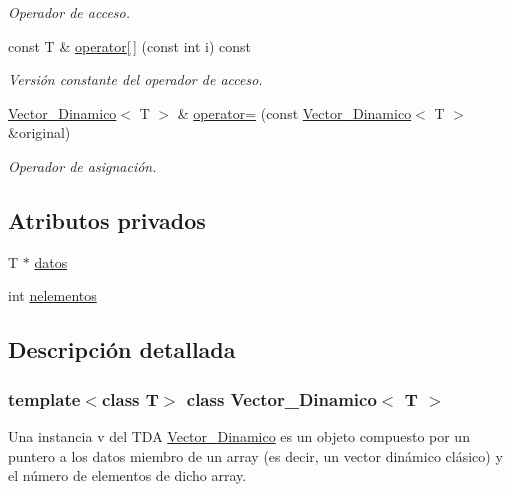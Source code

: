\begin{DoxyCompactItemize}
\begin{DoxyCompactList}\small\item\em Operador de acceso. \end{DoxyCompactList}\item 
const T \& \mbox{\hyperlink{classVector__Dinamico_a3129decf0d63405ced07ded86d5b05f3}{operator\mbox{[}$\,$\mbox{]}}} (const int i) const
\begin{DoxyCompactList}\small\item\em Versión constante del operador de acceso. \end{DoxyCompactList}\item 
\mbox{\hyperlink{classVector__Dinamico}{Vector\+\_\+\+Dinamico}}$<$ T $>$ \& \mbox{\hyperlink{classVector__Dinamico_afb18b6fd0649b3d62506d95f5ee851cc}{operator=}} (const \mbox{\hyperlink{classVector__Dinamico}{Vector\+\_\+\+Dinamico}}$<$ T $>$ \&original)
\begin{DoxyCompactList}\small\item\em Operador de asignación. \end{DoxyCompactList}\end{DoxyCompactItemize}
\subsection*{Atributos privados}
\begin{DoxyCompactItemize}
\item 
T $\ast$ \mbox{\hyperlink{classVector__Dinamico_a979957915b8a7b247d62720d7afed600}{datos}}
\item 
int \mbox{\hyperlink{classVector__Dinamico_afdc191eed18585e94d6f192b2dda15be}{nelementos}}
\end{DoxyCompactItemize}


\subsection{Descripción detallada}
\subsubsection*{template$<$class T$>$\newline
class Vector\+\_\+\+Dinamico$<$ T $>$}

Una instancia v del T\+DA \mbox{\hyperlink{classVector__Dinamico}{Vector\+\_\+\+Dinamico}} es un objeto compuesto por un puntero a los datos miembro de un array (es decir, un vector dinámico clásico) y el número de elementos de dicho array. 

